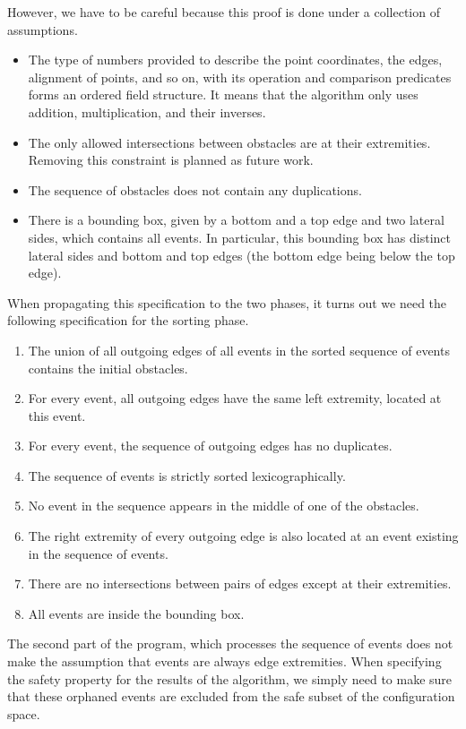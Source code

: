 \documentclass[a4paper, USenglish, cleveref, autoref, thm-restate, final]{lipics-v2021}
\begin{document}
However, we have to be careful because this proof is done under a
collection of assumptions.
\begin{itemize}
\item The type of numbers provided to describe the point coordinates,
  the edges, alignment of points, and so on, with its operation and
  comparison predicates forms an ordered field structure.  It means that the
  algorithm only uses addition, multiplication, and their inverses.
\item The only allowed intersections between obstacles are at their
  extremities.  Removing this constraint is planned as future work.
\item The sequence of obstacles does not contain any duplications.
\item There is a bounding box, given by a bottom and a top edge and two
  lateral sides, which contains all events.  In particular, this bounding box
  has distinct lateral sides and bottom and top edges (the bottom edge being
  below the top edge).
\end{itemize}
When propagating this specification to the two phases, it turns out we
need the following specification for the sorting phase.
\begin{enumerate}
\item The union of all outgoing edges of all events in the sorted
  sequence of events contains the initial obstacles.
\item For every event, all outgoing edges have the same left
  extremity, located at this event.
\item For every event, the sequence of outgoing edges has no duplicates.
\item The sequence of events is strictly sorted lexicographically.
\item No event in the sequence appears in the middle of one of the
  obstacles.
\item The right extremity of every outgoing edge is also located at an
  event existing in the sequence of events.
\item There are no intersections between pairs of edges except at their
  extremities.
\item All events are inside the bounding box.
\end{enumerate}
The second part of the program, which processes the sequence of events
does not make the assumption that events are always edge extremities.
When specifying the safety
property for the results of the algorithm, we simply need to make sure
that these orphaned events are excluded from the safe subset of the
configuration space.
\end{document}
